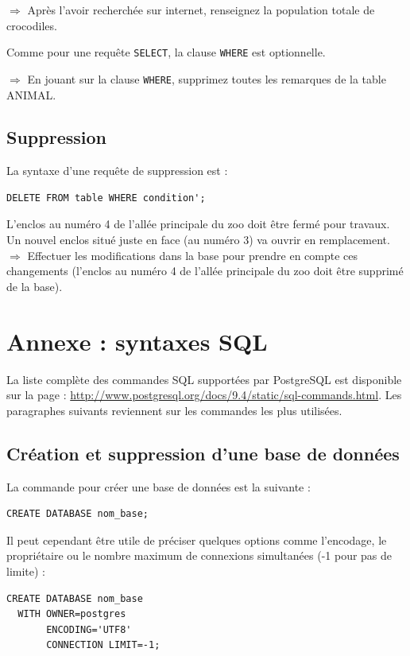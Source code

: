 \documentclass[11pt]{article}
\newcommand{\action}{$\Rightarrow$ }
\begin{document}
\action Après l'avoir recherchée sur internet, renseignez la population totale de crocodiles.

Comme pour une requête \lstinline{SELECT}, la clause \lstinline{WHERE} est optionnelle.

\action En jouant sur la clause \lstinline{WHERE}, supprimez toutes les remarques de la table ANIMAL.


\subsection{Suppression}
La syntaxe d'une requête de suppression est :
\begin{lstlisting}
DELETE FROM table WHERE condition';
\end{lstlisting}

L'enclos au numéro 4 de l'allée principale du zoo doit être fermé pour travaux. Un nouvel enclos situé juste en face (au numéro 3) va ouvrir en remplacement.
$\Rightarrow$ Effectuer les modifications dans la base pour prendre en compte ces changements (l'enclos au numéro 4 de l'allée principale du zoo doit être supprimé de la base).


\newpage
		
		
		\section{Annexe : syntaxes SQL}
			La liste complète des commandes SQL supportées par PostgreSQL est disponible sur la page : \url{http://www.postgresql.org/docs/9.4/static/sql-commands.html}. Les paragraphes suivants reviennent sur les commandes les plus utilisées.
			
			\subsection{Création et suppression d'une base de données}
				La commande pour créer une base de données est la suivante :\\
				\begin{lstlisting}
CREATE DATABASE nom_base;
				\end{lstlisting}
			
				Il peut cependant être utile de préciser quelques options comme l'encodage, le propriétaire ou le nombre maximum de connexions simultanées (-1 pour pas de limite) :
				\begin{lstlisting}
CREATE DATABASE nom_base
  WITH OWNER=postgres
       ENCODING='UTF8'
       CONNECTION LIMIT=-1;
			\end{lstlisting}
			
\end{document}
